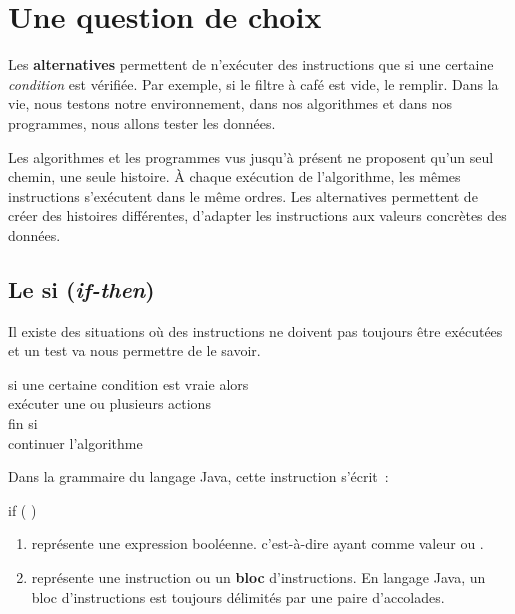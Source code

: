 \chapter{Une question de choix}

	Les \textbf{alternatives} permettent de n’exécuter des
	instructions que si une certaine \emph{condition} est vérifiée.  
	Par exemple, si le filtre à café est vide, le remplir. Dans la vie, nous 
	testons notre environnement, dans nos algorithmes
	et dans nos programmes, nous allons tester les données.
	
	Les algorithmes et les programmes vus jusqu’à présent ne proposent qu’un
	seul \og{}chemin\fg{}, une seule \og{}histoire\fg{}.  À chaque exécution de
	l’algorithme, les mêmes instructions s’exécutent dans le même ordres.  Les
	alternatives permettent de créer des histoires différentes, d’adapter les
	instructions aux valeurs concrètes des données.  

	\minitoc 

\section{Le si (\textit{if-then})}
		
	Il existe des situations où des instructions ne doivent pas toujours être
	exécutées et un test va nous permettre de le savoir.
	
	\begin{langagenaturel}
		si une certaine condition est vraie alors\\
		\tab exécuter une ou plusieurs actions\\
		fin si\\
		continuer l'algorithme
	\end{langagenaturel}

	Dans la grammaire du langage Java, cette instruction s'écrit~:
	
	\begin{grammaire}
		if (  ) 
	\end{grammaire}

	\begin{enumerate}
		\item {} représente une expression booléenne. 
			c'est-à-dire ayant comme valeur  ou .
		\item {} représente une instruction ou un 
			\textbf{bloc} d'instructions. En langage Java, un bloc 
			 d'instructions est toujours délimités par une paire 
			d'accolades. 
	\end{enumerate}

